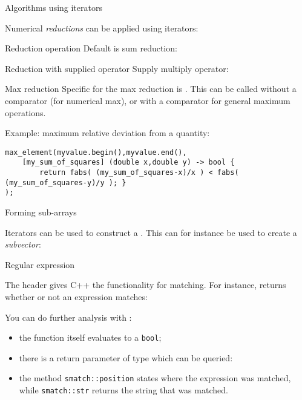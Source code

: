  {Algorithms using iterators}
\label{sec:alg-iter}

Numerical \emph{reductions} can be applied using iterators:
\begin{block}{Reduction operation}
  \label{sl:vec-accumulate}
  Default is sum reduction:
\end{block}

\begin{block}{Reduction with supplied operator}
  \label{sl:vec-multiplies}
  Supply multiply operator:
\end{block}

\begin{block}{Max reduction}
  Specific for the max reduction is .
  This can be called without a comparator (for numerical max),
  or with a comparator for general maximum operations.

  Example: maximum relative deviation from a quantity:
\begin{lstlisting}
max_element(myvalue.begin(),myvalue.end(),
    [my_sum_of_squares] (double x,double y) -> bool {
        return fabs( (my_sum_of_squares-x)/x ) < fabs( (my_sum_of_squares-y)/y ); }
);
\end{lstlisting}
\end{block}

 {Forming sub-arrays}

Iterators can be used to construct a . This can
for instance be used to create a
\emph{subvector}:
%

 {Regular expression}

The header  gives C++ the functionality for
 matching. For instance,
 returns whether or not an expression matches:


You can do further analysis with :
\begin{itemize}
\item the function itself evaluates to a \lstinline{bool};
\item there is a return parameter of type  which can
  be queried:
\item the method \lstinline{smatch::position} states where the expression
  was matched, while \lstinline{smatch::str} returns the string that
  was matched.
\end{itemize}

